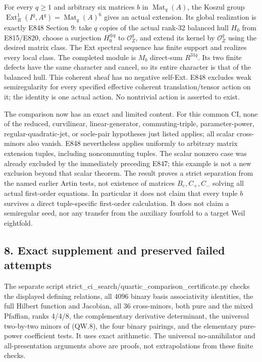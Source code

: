For every \(q\ge1\) and arbitrary six matrices \(b\) in \(\operatorname{Mat}_q(A)\), the
Koszul group \(\operatorname{Ext}^1_R(I^q,A^q)=\operatorname{Mat}_q(A)^6\) gives an actual extension.
Its global realization is exactly E848 Section 9: take \(q\) copies
of the actual rank-32 balanced hull \(H_0\) from E815/E820, choose a
surjection \(H_0^{\oplus q}\) to \(\mathcal O_Z^q\), and extend its kernel by \(\mathcal O_Z^q\)
using the desired matrix class. The Ext spectral sequence has
finite support and realizes every local class. The completed
module is \(M_b\) direct-sum \(R^{31q}\). Its two finite defects have the
same character and cancel, so its entire character is that of
the balanced hull. This coherent sheaf has no negative self-Ext.
E848 excludes weak semiregularity for every specified effective
coherent translation/tensor action on it; the identity is one
actual action. No nontrivial action is asserted to exist.

The comparison now has an exact and limited content. For this
common CI, none of the reduced, curvilinear, linear-generator,
commuting-triple, parameter-power, regular-quadratic-jet, or
socle-pair hypotheses just listed applies; all scalar cross-minors
also vanish. E848 nevertheless applies uniformly to arbitrary
matrix extension tuples, including noncommuting tuples. The scalar
nonzero case was already excluded by the immediately preceding
E847; this example is not a new exclusion beyond that scalar
theorem. The result proves a strict separation from the named
earlier Artin tests, not existence of matrices \(B_e,C_+,C_-\) solving
all actual first-order equations. In particular it does not claim
that every tuple \(b\) survives a direct tuple-specific first-order
calculation. It does not claim a semiregular seed, nor any transfer
from the auxiliary fourfold to a target Weil eightfold.

\subsection{8. Exact supplement and preserved failed attempts}\label{SF-E848W:s8}

The separate script strict\_ci\_search/quartic\_comparison\_certificate.py
checks the displayed defining relations, all 4096 binary basis
associativity identities, the full Hilbert function and Jacobian,
all 36 cross-minors, both pure and the mixed Pfaffian, ranks 4/4/8,
the complementary derivative determinant, the universal two-by-two
minors of (QW.8), the four binary pairings, and the elementary
pure-power coefficient tests. It uses exact arithmetic. The
universal no-annihilator and all-presentation arguments above are
proofs, not extrapolations from these finite checks.

